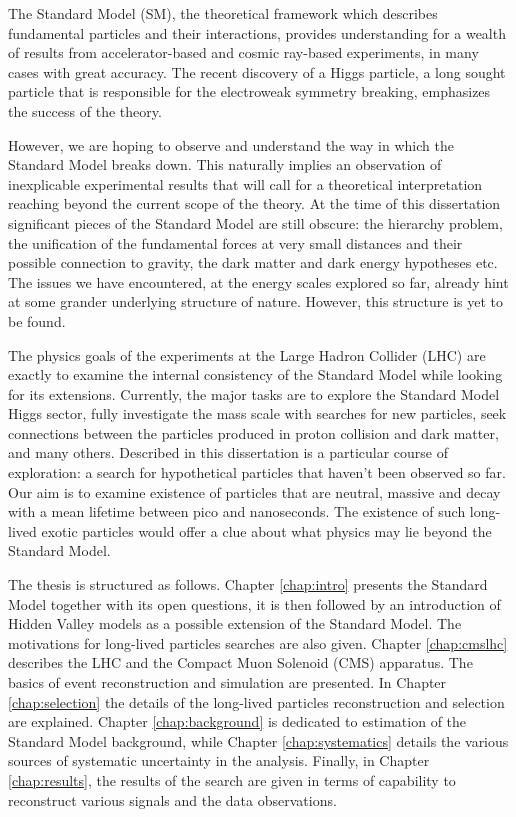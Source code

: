 The Standard Model (SM), the theoretical framework which describes fundamental particles
and their interactions, provides understanding for a wealth of results from accelerator-based
and cosmic ray-based experiments, in many cases with great accuracy.
The recent discovery of a Higgs particle, a long sought particle that is responsible for
the electroweak symmetry 
breaking, emphasizes the success of the theory.

However, we are hoping to observe and understand the way in which the Standard Model breaks down.
This naturally implies an observation of inexplicable experimental results that will call for
a theoretical interpretation reaching beyond the current scope of the theory.
At the time of this dissertation 
significant pieces of the Standard Model are still obscure: the hierarchy
problem, the unification of the fundamental forces at very small distances and their possible
connection to gravity, the dark matter and dark energy hypotheses etc.
The issues we have encountered, at the energy scales explored so far, already
hint at some grander underlying structure of nature. However, this structure is yet to be found.

The physics goals of the experiments at the Large Hadron Collider (LHC) are exactly to 
examine the internal consistency of the Standard Model while looking for its extensions.
Currently, the major tasks are to explore
the Standard Model Higgs sector, fully investigate the \TeV mass scale with searches
for new particles, seek connections between the particles 
produced in proton collision and dark matter, and many others. 
Described in this dissertation is a particular course of exploration: a search for hypothetical
particles that haven't been observed so far. Our aim is to examine existence of particles
that are neutral, 
massive and decay with a mean lifetime between pico and nanoseconds. The existence
of such long-lived exotic
particles would offer a clue about what physics may lie beyond the Standard Model.

The thesis is structured as follows. Chapter \ref{chap:intro}
 presents the Standard Model together with its
open questions, it is then followed by an introduction of Hidden Valley models as a possible
 extension of the Standard Model. The motivations for long-lived particles searches are also 
given.
Chapter \ref{chap:cmslhc} describes the LHC and the Compact Muon Solenoid (CMS) apparatus.
 The basics of event reconstruction and simulation are presented. In Chapter \ref{chap:selection}
the details of the long-lived particles reconstruction and selection are explained. 
Chapter \ref{chap:background} is dedicated to estimation of the Standard Model
 background, while Chapter
\ref{chap:systematics} details the various sources of systematic uncertainty in the analysis.
Finally, in Chapter \ref{chap:results}, the results of the search are given in terms
of capability to reconstruct various signals and the data observations.

